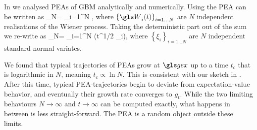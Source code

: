 In \cite{PetersKlein2013} we analysed PEAs of GBM analytically and numerically. Using  the PEA can be written as
\be
{}_N= \sum_{i=1}^N \exp{},
\ee
where $\left\{\gW_i(t)\right\}_{i=1\dots N}$ are $N$ independent realisations of the Wiener process. Taking the deterministic part out of the sum we re-write  as
\be
{}_N=\exp{}  \sum_{i=1}^N \exp\left(t^{1/2} \sigma \xi_i\right),
\ee
where $\left\{\xi_i\right\}_{i=1\dots N}$ are $N$ independent standard normal variates.

We found that typical trajectories of PEAs grow at $\gex$ up to a time $t_c$ 
that is logarithmic in $N$, meaning $t_c\propto \ln N$. This is consistent with our sketch in . After this time, typical 
PEA-trajectories begin to deviate from expectation-value behavior, and eventually 
their growth rate converges to $g_t$. While the two limiting behaviours $N\to\infty$
and $t\to \infty$ can be computed exactly, what happens in between
is less straight-forward. The PEA is a random object outside these limits. 

%

